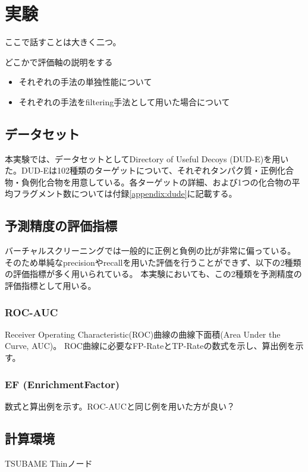 \chapter{実験}

ここで話すことは大きく二つ。

どこかで評価軸の説明をする
\begin{itemize}
\item それぞれの手法の単独性能について
\item それぞれの手法をfiltering手法として用いた場合について
\end{itemize}


\section{データセット}
本実験では、データセットとしてDirectory of Useful Decoys (DUD-E)\citetodo{}を用いた。DUD-Eは102種類のターゲットについて、それぞれタンパク質・正例化合物・負例化合物を用意している。各ターゲットの詳細、および1つの化合物の平均フラグメント数については付録\ref{appendix:dude}に記載する。


\section{予測精度の評価指標}
バーチャルスクリーニングでは一般的に正例と負例の比が非常に偏っている。
そのため単純なprecisionやrecallを用いた評価を行うことができず、以下の2種類の評価指標が多く用いられている。
本実験においても、この2種類を予測精度の評価指標として用いる。

\subsection{ROC-AUC}
Receiver Operating Characteristic(ROC)曲線の曲線下面積(Area Under the Curve, AUC)。
ROC曲線に必要なFP-RateとTP-Rateの数式を示し、算出例を示す。

\subsection{EF (EnrichmentFactor)}
数式と算出例を示す。ROC-AUCと同じ例を用いた方が良い？


\section{計算環境}
TSUBAME Thinノード


